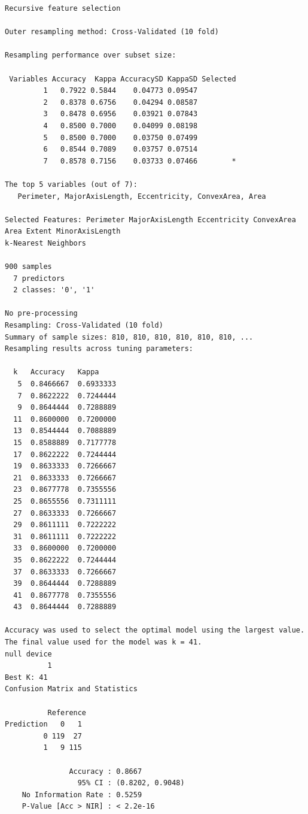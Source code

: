 \documentclass{article}
\begin{document}
\begin{thebibliography}{9}
\begin{verbatim}
Recursive feature selection

Outer resampling method: Cross-Validated (10 fold) 

Resampling performance over subset size:

 Variables Accuracy  Kappa AccuracySD KappaSD Selected
         1   0.7922 0.5844    0.04773 0.09547         
         2   0.8378 0.6756    0.04294 0.08587         
         3   0.8478 0.6956    0.03921 0.07843         
         4   0.8500 0.7000    0.04099 0.08198         
         5   0.8500 0.7000    0.03750 0.07499         
         6   0.8544 0.7089    0.03757 0.07514         
         7   0.8578 0.7156    0.03733 0.07466        *

The top 5 variables (out of 7):
   Perimeter, MajorAxisLength, Eccentricity, ConvexArea, Area

Selected Features: Perimeter MajorAxisLength Eccentricity ConvexArea Area Extent MinorAxisLength 
k-Nearest Neighbors 

900 samples
  7 predictors
  2 classes: '0', '1' 

No pre-processing
Resampling: Cross-Validated (10 fold) 
Summary of sample sizes: 810, 810, 810, 810, 810, 810, ... 
Resampling results across tuning parameters:

  k   Accuracy   Kappa    
   5  0.8466667  0.6933333
   7  0.8622222  0.7244444
   9  0.8644444  0.7288889
  11  0.8600000  0.7200000
  13  0.8544444  0.7088889
  15  0.8588889  0.7177778
  17  0.8622222  0.7244444
  19  0.8633333  0.7266667
  21  0.8633333  0.7266667
  23  0.8677778  0.7355556
  25  0.8655556  0.7311111
  27  0.8633333  0.7266667
  29  0.8611111  0.7222222
  31  0.8611111  0.7222222
  33  0.8600000  0.7200000
  35  0.8622222  0.7244444
  37  0.8633333  0.7266667
  39  0.8644444  0.7288889
  41  0.8677778  0.7355556
  43  0.8644444  0.7288889

Accuracy was used to select the optimal model using the largest value.
The final value used for the model was k = 41.
null device 
          1 
Best K: 41 
Confusion Matrix and Statistics

          Reference
Prediction   0   1
         0 119  27
         1   9 115
                                          
               Accuracy : 0.8667          
                 95% CI : (0.8202, 0.9048)
    No Information Rate : 0.5259          
    P-Value [Acc > NIR] : < 2.2e-16       
                                          

\end{verbatim}
\end{thebibliography}
\end{document}
